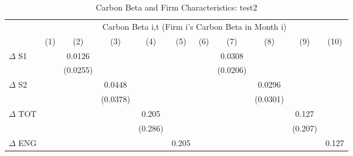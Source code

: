 \begin{table}[htbp]\centering
\def\sym#1{\ifmmode^{#1}\else\(^{#1}\)\fi}
\caption{Carbon Beta and Firm Characteristics: test2}
\begin{tabular}{l*{10}{c}}
\hline\hline
                &\multicolumn{10}{c}{Carbon Beta i,t (Firm i's Carbon Beta in Month i)}                                                                                                                       \\\cmidrule(lr){2-11}
                &\multicolumn{1}{c}{(1)}         &\multicolumn{1}{c}{(2)}         &\multicolumn{1}{c}{(3)}         &\multicolumn{1}{c}{(4)}         &\multicolumn{1}{c}{(5)}         &\multicolumn{1}{c}{(6)}         &\multicolumn{1}{c}{(7)}         &\multicolumn{1}{c}{(8)}         &\multicolumn{1}{c}{(9)}         &\multicolumn{1}{c}{(10)}         \\
\hline
$\Delta$ S1     &                  &   0.0126         &                  &                  &                  &                  &   0.0308         &                  &                  &                  \\
                &                  & (0.0255)         &                  &                  &                  &                  & (0.0206)         &                  &                  &                  \\
$\Delta$ S2     &                  &                  &   0.0448         &                  &                  &                  &                  &   0.0296         &                  &                  \\
                &                  &                  & (0.0378)         &                  &                  &                  &                  & (0.0301)         &                  &                  \\
$\Delta$ TOT    &                  &                  &                  &    0.205         &                  &                  &                  &                  &    0.127         &                  \\
                &                  &                  &                  &  (0.286)         &                  &                  &                  &                  &  (0.207)         &                  \\
$\Delta$ ENG    &                  &                  &                  &                  &    0.205         &                  &                  &                  &                  &    0.127         \\

\end{tabular}
\end{table}
